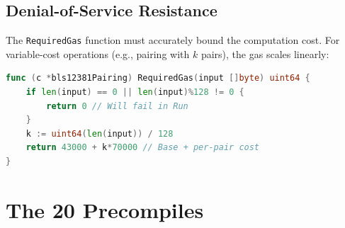 \documentclass[11pt,a4paper]{article}
\begin{document}
\subsection{Denial-of-Service Resistance}

The \texttt{RequiredGas} function must accurately bound the computation cost. For
variable-cost operations (e.g., pairing with $k$ pairs), the gas scales linearly:

\begin{lstlisting}[language=Go,caption={Variable gas cost for pairing}]
func (c *bls12381Pairing) RequiredGas(input []byte) uint64 {
    if len(input) == 0 || len(input)%128 != 0 {
        return 0 // Will fail in Run
    }
    k := uint64(len(input)) / 128
    return 43000 + k*70000 // Base + per-pair cost
}
\end{lstlisting}

\section{The 20 Precompiles}
\end{document}
